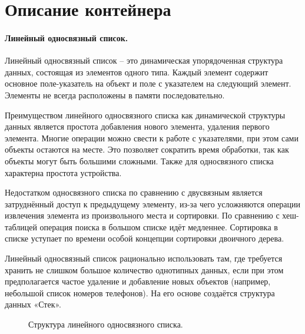 ﻿\section{Описание контейнера}

\paragraph{Линейный односвязный список.}

Линейный односвязный список – это динамическая упорядоченная структура данных, состоящая из элементов одного типа. Каждый элемент содержит основное поле-указатель на объект и поле с указателем на следующий элемент. Элементы не всегда расположены в памяти последовательно.

Преимуществом линейного односвязного списка как динамической структуры данных является простота добавления нового элемента, удаления первого элемента. Многие операции можно свести к работе с указателями, при этом сами объекты остаются на месте.
Это позволяет сократить время обработки, так как объекты могут быть большими сложными. Также для односвязного списка характерна простота устройства.

Недостатком односвязного списка по сравнению с двусвязным является затруднённый доступ к предыдущему элементу, из-за чего усложняются операции извлечения элемента из произвольного места и сортировки. По сравнению с хеш-таблицей операция поиска в большом списке идёт медленнее. Сортировка в списке уступает по времени особой концепции сортировки двоичного дерева.

Линейный односвязный список рационально использовать там, где требуется хранить не слишком большое количество однотипных данных, если при этом предполагается частое удаление и добавление новых объектов (например, небольшой список номеров телефонов). На его основе создаётся структура данных «Стек». 

\begin{figure}[h]
\caption{Структура линейного односвязного списка.}
\end{figure}